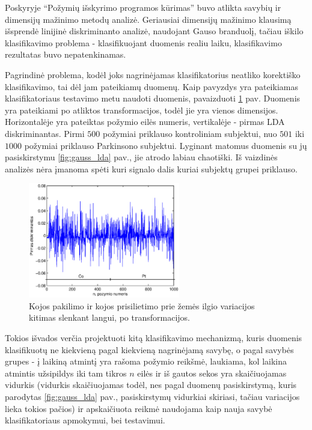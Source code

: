 \documentclass[]{vgtuef}
\begin{document}
Poskyryje ``Požymių išskyrimo programos kūrimas'' buvo atlikta savybių ir dimensijų mažinimo metodų analizė. Geriausiai dimensijų mažinimo klausimą išsprendė linijinė diskriminanto analizė, naudojant Gauso branduolį, tačiau iškilo klasifikavimo problema - klasifikuojant duomenis realiu laiku, klasifikavimo rezultatas buvo nepatenkinamas. 

Pagrindinė problema, kodėl joks nagrinėjamas klasifikatorius neatliko korektiško klasifikavimo, tai dėl jam pateikiamų duomenų. Kaip pavyzdys yra pateikiamas klasifikatoriaus testavimo metu naudoti duomenis, pavaizduoti \ref{fig:testing_sample} pav. Duomenis yra pateikiami po atliktos transformacijos, todėl jie yra vienos dimensijos. Horizontalėje yra pateiktas požymio eilės numeris, vertikalėje - pirmas LDA diskriminantas. Pirmi $500$ požymiai priklauso kontroliniam subjektui, nuo $501$ iki $1000$ požymiai priklauso Parkinsono subjektui. Lyginant matomus duomenis su jų pasiskirstymu \ref{fig:gauss_lda} pav., jie atrodo labiau chaotiški. Iš vaizdinės analizės nėra įmanoma spėti kuri signalo dalis kuriai subjektų grupei priklauso. 

\begin{figure}
	\centering
	\includegraphics[width=250px]{figures/11_sample_testing}
	\caption{Kojos pakilimo ir kojos prisilietimo prie žemės ilgio variacijos kitimas slenkant langui, po transformacijos.}
	\label{fig:testing_sample}
\end{figure}

Tokios išvados verčia projektuoti kitą klasifikavimo mechanizmą, kuris duomenis klasifikuotų ne kiekvieną pagal kiekvieną nagrinėjamą savybę, o pagal savybės grupes - į laikiną atmintį yra rašoma požymio reikšmė, laukiama, kol laikina atmintis užsipildys iki tam tikros $n$ eilės ir iš gautos sekos yra skaičiuojamas vidurkis (vidurkis skaičiuojamas todėl, nes pagal duomenų pasiskirstymą, kuris parodytas \ref{fig:gauss_lda} pav., pasiskirstymų vidurkiai skiriasi, tačiau variacijos lieka tokios pačios) ir apskaičiuota reikmė naudojama kaip nauja savybė klasifikatoriaus apmokymui, bei testavimui. 
\end{document}
